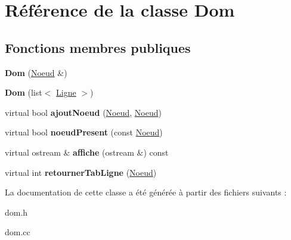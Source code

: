 \hypertarget{classDom}{
\section{Référence de la classe Dom}
\label{classDom}
}
\subsection*{Fonctions membres publiques}
\begin{DoxyCompactItemize}
\item 
\hypertarget{classDom_a3760e9581e6764d429fc68d070546f3f}{
{\bfseries Dom} (\hyperlink{classNoeud}{Noeud} \&)}
\label{classDom_a3760e9581e6764d429fc68d070546f3f}

\item 
\hypertarget{classDom_ae02da1237c5c884af49ea992417cfdcd}{
{\bfseries Dom} (list$<$ \hyperlink{classLigne}{Ligne} $>$)}
\label{classDom_ae02da1237c5c884af49ea992417cfdcd}

\item 
\hypertarget{classDom_a004727d04374bcd4db46903a96025e14}{
virtual bool {\bfseries ajoutNoeud} (\hyperlink{classNoeud}{Noeud}, \hyperlink{classNoeud}{Noeud})}
\label{classDom_a004727d04374bcd4db46903a96025e14}

\item 
\hypertarget{classDom_a443bf9fccfec2503a42bde6ba9eb861a}{
virtual bool {\bfseries noeudPresent} (const \hyperlink{classNoeud}{Noeud})}
\label{classDom_a443bf9fccfec2503a42bde6ba9eb861a}

\item 
\hypertarget{classDom_a692547ba6010fd70040e8b4ab2805349}{
virtual ostream \& {\bfseries affiche} (ostream \&) const }
\label{classDom_a692547ba6010fd70040e8b4ab2805349}

\item 
\hypertarget{classDom_a4d6904c4a8d8a5fac4f8f07e1a7152d6}{
virtual int {\bfseries retournerTabLigne} (\hyperlink{classNoeud}{Noeud})}
\label{classDom_a4d6904c4a8d8a5fac4f8f07e1a7152d6}

\end{DoxyCompactItemize}


La documentation de cette classe a été générée à partir des fichiers suivants :\begin{DoxyCompactItemize}
\item 
dom.h\item 
dom.cc\end{DoxyCompactItemize}
